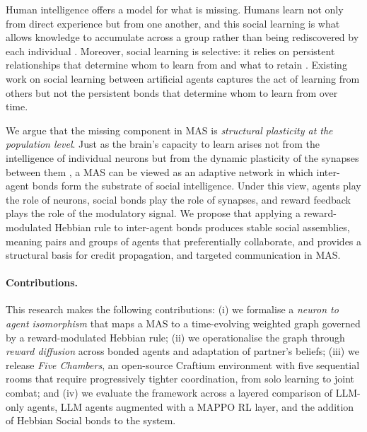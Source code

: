 \documentclass{article}
\theoremstyle{plain}
\theoremstyle{definition}
\theoremstyle{remark}
\begin{document}
Human intelligence offers a model for what is missing. Humans learn not only from direct experience but from one another, and this social learning is what allows knowledge to accumulate across a group rather than being rediscovered by each individual \cite{tomasello1993cultural, hoppitt2013social, boyd2011cultural}. Moreover, social learning is selective: it relies on persistent relationships that determine whom to learn from and what to retain \cite{kendal2018social}. Existing work on social learning between artificial agents \cite{ndousse2021emergent, hillier2024social} captures the act of learning from others but not the persistent bonds that determine whom to learn from over time.

We argue that the missing component in MAS is \emph{structural plasticity at the population level}. Just as the brain's capacity to learn arises not from the intelligence of individual neurons but from the dynamic plasticity of the synapses between them \cite{hebb2005organization, kusmierz2017learning}, a MAS can be viewed as an adaptive network in which inter-agent bonds form the substrate of social intelligence. Under this view, agents play the role of neurons, social bonds play the role of synapses, and reward feedback plays the role of the modulatory signal. We propose that applying a reward-modulated Hebbian rule to inter-agent bonds produces stable social assemblies, meaning pairs and groups of agents that preferentially collaborate, and provides a structural basis for credit propagation, and targeted communication in MAS.

\paragraph{Contributions.} This research makes the following contributions: (i) we formalise a \emph{neuron to agent isomorphism} that maps a MAS to a time-evolving weighted graph governed by a reward-modulated Hebbian rule; (ii) we operationalise the graph through \emph{reward diffusion} across bonded agents and adaptation of partner's beliefs; (iii) we release \emph{Five Chambers}, an open-source Craftium environment with five sequential rooms that require progressively tighter coordination, from solo learning to joint combat; and (iv) we evaluate the framework across a layered comparison of LLM-only agents, LLM agents augmented with a MAPPO RL layer, and the addition of Hebbian Social bonds to the system.
\end{document}
